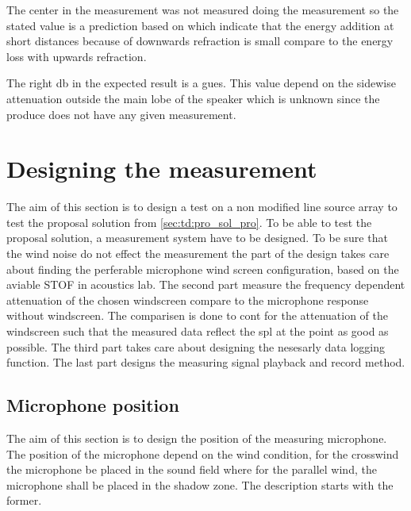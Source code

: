 
The center in the measurement was not measured doing the measurement so the stated value is a prediction based on \citep{review_of_sound} which indicate that the energy addition at short distances because of downwards refraction is small compare to the energy loss with upwards refraction. 

The right \si{\decibel} in the expected result is a gues. This value depend on the sidewise attenuation outside the main lobe of the speaker which is unknown since the produce does not have any given measurement.



\section{Designing the measurement}
The aim of this section is to design a test on a non modified line source array to test the proposal solution from \autoref{sec:td:pro_sol_pro}. To be able to test the proposal solution, a measurement system have to be designed. To be sure that the wind noise do not effect the measurement the part of the design takes care about finding the perferable microphone wind screen configuration, based on the aviable STOF in acoustics lab. The second part measure the frequency dependent attenuation of the chosen windscreen compare to the microphone response without windscreen. The comparisen is done to cont for the attenuation of the windscreen such that the measured data reflect the \gls{spl} at the point as good as possible. The third part takes care about designing the nesesarly data logging function. The last part designs the measuring signal playback and record method.

\subsection{Microphone position}
The aim of this section is to design the position of the measuring microphone. The position of the microphone depend on the wind condition, for the crosswind the microphone be placed in the sound field where for the parallel wind, the microphone shall be placed in the shadow zone. The description starts with the former.


